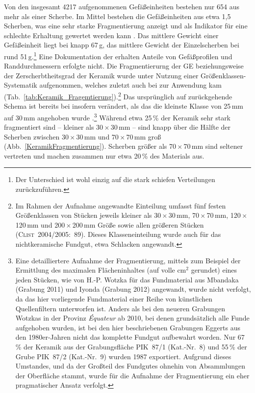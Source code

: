Von den insgesamt 4217 aufgenommenen Gefäßeinheiten bestehen nur 654 aus mehr als einer Scherbe. Im Mittel bestehen die Gefäßeinheiten aus etwa 1,5 Scherben, was eine sehr starke Fragmentierung anzeigt und als Indikator für eine schlechte Erhaltung gewertet werden kann \parencite[siehe][86]{Jesse.2003}. Das mittlere Gewicht einer Gefäßeinheit liegt bei knapp 67\,g, das mittlere Gewicht der Einzelscherben bei rund 51\,g.\footnote{Der Unterschied ist wohl einzig auf die stark schiefen Verteilungen zurückzuführen.} Eine Dokumentation der erhalten Anteile von Gefäßprofilen und Randdurchmessern \parencite[siehe hierzu][155ff.]{Claen.2011} erfolgte nicht. Die Fragmentierurng der GE beziehungsweise der Zerscherbtheitsgrad der Keramik wurde unter Nutzung einer Größenklassen-Systematik aufgenommen, welches zuletzt auch bei \textcite[89]{Clist.20042005} zur Anwendung kam (Tab.~\ref{tab:Keramik_Fragemtierung}).\footnote{Im Rahmen der Aufnahme angewandte Einteilung umfasst fünf festen Größenklassen von Stücken jeweils kleiner als 30\,$\times$\,30\,mm, 70\,$\times$\,70\,mm, 120\,$\times$\,120\,mm und 200\,$\times$\,200\,mm Größe sowie allen größeren Stücken (\textsc{Clist}~2004/2005:~89). Dieses Klasseneinteilung wurde auch für das nichtkeramische Fundgut, etwa Schlacken angewandt.} Das ursprünglich auf \textcite[379]{Joukowsky.1980} zurückgehende Schema ist bereits bei \textcite[89]{Clist.20042005} insofern verändert, als das die kleinste Klasse von 25\,mm auf 30\,mm angehoben wurde \parencites[nach][]{Claes.1985}{deMaret.1985}.\footnote{Eine detailliertere Aufnahme der Fragmentierung, mittels zum Beispiel der Ermittlung des maximalen Flächeninhaltes (auf volle cm$^2$ gerundet) eines jeden Stücken, wie von H.-P. Wotzka für das Fundmaterial aus Mbandaka (Grabung 2011) und Iyonda (Grabung 2012) angewandt, wurde nicht verfolgt, da das hier vorliegende Fundmaterial einer Reihe von künstlichen Quellenfiltern unterworfen ist. Anders als bei den neueren Grabungen Wotzkas in der Provinz \textit{Équateur} ab 2010, bei denen grundsätzlich alle Funde aufgehoben wurden, ist bei den hier beschriebenen Grabungen Eggerts aus den 1980er-Jahren nicht das komplette Fundgut aufbewahrt worden. Nur 67\,\% der Keramik aus der Grabungsfläche PIK~87/1 (Kat.-Nr.~8) und 55\,\% der Grube PIK~87/2 (Kat.-Nr.~9) wurden 1987 exportiert. Aufgrund dieses Umstandes, und da der Großteil des Fundgutes ohnehin von Absammlungen der Oberfläche stammt, wurde für die Aufnahme der Fragmentierung ein eher pragmatischer Ansatz verfolgt.} Während etwa 25\,\% der Keramik sehr stark fragmentiert sind -- kleiner als 30\,$\times$\,30\,mm -- sind knapp über die Hälfte der Scherben zwischen 30\,$\times$\,30\,mm und 70\,$\times$\,70\,mm groß (Abb.~\ref{KeramikFragmentierung}). Scherben größer als 70\,$\times$\,70\,mm sind seltener vertreten und machen zusammen nur etwa 20\,\% des Materials aus.

